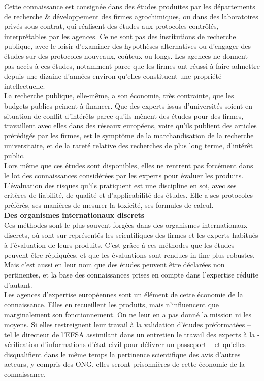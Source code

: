 \documentclass[8pt]{article}
\begin{document}
Cette connaissance est consignée dans des études produites par les ­départements de recherche \& développement des firmes agrochimiques, ou dans des laboratoires privés sous contrat, qui réalisent des études aux protocoles contrôlés, interprétables par les agences. Ce ne sont pas des institutions de recherche publique, avec le loisir d’examiner des hypothèses alternatives ou d’engager des études sur des protocoles nouveaux, ­coûteux ou longs. Les agences ne donnent pas accès à ces études, notamment parce que les firmes ont réussi à faire admettre depuis une dizaine d’années environ qu’elles constituent une propriété intellectuelle.\\

La recherche publique, elle-même, a son économie, très contrainte, que les budgets publics peinent à financer. Que des experts issus d’universités soient en situation de conflit d’intérêts parce qu’ils mènent des études pour des firmes, travaillent avec elles dans des réseaux européens, voire qu’ils publient des articles prérédigés par les firmes, est le symptôme de la marchandisation de la recherche universitaire, et de la rareté relative des recherches de plus long terme, d’intérêt public.\\

Lors même que ces études sont disponibles, elles ne rentrent pas forcément dans le lot des connaissances considérées par les experts pour évaluer les produits. L’évaluation des risques qu’ils pratiquent est une discipline en soi, avec ses critères de fiabilité, de qualité et d’applicabilité des études. Elle a ses protocoles préférés, ses manières de mesurer la toxicité, ses formules de calcul.\\

\textbf{Des organismes internationaux discrets}\\

Ces méthodes sont le plus souvent forgées dans des organismes internationaux discrets, où sont sur-représentés les scientifiques des firmes et les experts habitués à l’évaluation de leurs produits. C’est grâce à ces méthodes que les études peuvent être répliquées, et que les évaluations sont rendues in fine plus ­robustes. Mais c’est aussi en leur nom que des études peuvent être déclarées non pertinentes, et la base des ­connaissances prises en compte dans l’expertise réduite d’autant. \\

Les agences d’expertise européennes sont un élément de cette économie de la connaissance. Elles en ­recueillent les produits, mais n’influencent que marginalement son fonctionnement. On ne leur en a pas donné la mission ni les moyens. Si ­elles restreignent leur travail à la validation d’études préformatées – tel le directeur de l’EFSA assimilant dans un entretien le travail des experts à la ­vérification d’informations d’état civil pour délivrer un passeport – et qu’elles disqualifient dans le même temps la pertinence scientifique des avis d’autres acteurs, y compris des ONG, elles seront prisonnières de cette économie de la connaissance.\\
\end{document}
